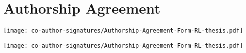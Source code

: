 
\chapter{Authorship Agreement} \label{app:author-agreements}

\newpage
\texttt{[image: co-author-signatures/Authorship-Agreement-Form-RL-thesis.pdf]}

\newpage
\texttt{[image: co-author-signatures/Authorship-Agreement-Form-RL-thesis.pdf]}